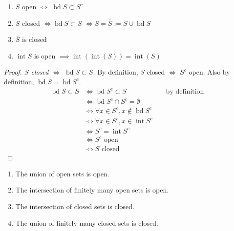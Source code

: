 \begin{proposition}
    \hfill
    \begin{enumerate}
        \item $S$ open $\iff$ $\operatorname{bd} S \subset S^c$
        \item $S$ closed 
$\iff \operatorname{bd} S \subset S$
$\iff S = \overline{S} := S \cup \operatorname{bd} S$ 
        \item $\overline{S}$ is closed
        \item $\operatorname{int} S$ is open $\implies \operatorname{int} \left( \operatorname{int} (S)  \right) = \operatorname{int}(S)  $
    \end{enumerate}
\end{proposition}

\begin{proof}[Proof. $S$ closed $\iff$ $\operatorname{bd} S \subset S$]
    \hfill

    By definition, $S$ closed $\iff$ $S^c$ open. 
    Also by definition, $\operatorname{bd} S = \operatorname{bd} S^c$.
    \begin{align*}
        \operatorname{bd} S \subset S & \iff \operatorname{bd} S^c \subset S && \text{ by definition} \\
        & \iff \operatorname{bd} S^c \cap S^c = \emptyset \\
        & \iff \forall x \in S^c, x \notin \operatorname{bd} S^c \\
        & \iff \forall x \in S^c, x \in \operatorname{int} S^c \\
        & \iff S^c = \operatorname{int} S^c \\
        & \iff S^c \text{ open} \\
        & \iff S \text{ closed}
    \end{align*}
\end{proof}

\begin{proposition}\label{prop:union-open}
    \hfill
    \begin{enumerate}
        \item The union of open sets is open.  
        \item The intersection of finitely many open sets is open.
        \item The intersection of closed sets is closed. 
        \item The union of finitely many closed sets is closed.
    \end{enumerate}
\end{proposition}

